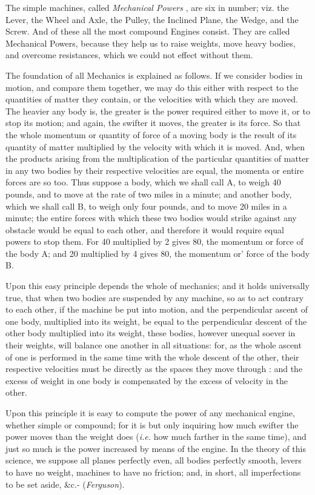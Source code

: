 The simple machines, called \textit{Mechanical Powers} , are six in number; viz. the Lever, the Wheel and Axle, the Pulley, the Inclined Plane, the Wedge, and the Screw. And of these all the most compound Engines consist. They are called Mechanical Powers, because they help us to raise weights, move heavy bodies, and overcome resistances, which we could not effect without them. 

The foundation of all Mechanics is explained as follows. If we consider bodies in motion, and compare them together, we may do this either with respect to the quantities of matter they contain, or the velocities with which they are moved. The heavier any body is, the greater is the power required either to move it, or to stop its motion; and again, the swifter it moves, the greater is its force. So that the whole momentum or quantity of force of a moving body is the result of its quantity of matter multiplied by the velocity with which it is moved. And, when the products arising from the multiplication of the particular quantities of matter in any two bodies by their respective velocities are equal, the momenta or entire forces are so too. Thus suppose a body, which we shall call A, to weigh 40 pounds, and to move at the rate of two miles in a minute; and another body, which we shall call B, to weigh only four pounds, and to move 20 miles in a minute; the entire forces with which these two bodies would strike against any obstacle would be equal to each other, and therefore it would require equal powers to stop them. For 40 multiplied by 2 gives 80, the momentum or force of the body A; and 20 multiplied by 4 gives 80, the momentum or' force of the body B. 

Upon this easy principle depends the whole of mechanics; and it holds universally true, that when two bodies are suspended by any machine, so as to act contrary to each other, if the machine be put into motion, and the perpendicular ascent of one body, multiplied into its weight, be equal to the perpendicular descent of the other body multiplied into its weight, these bodies, however unequal soever in their weights, will balance one another in all situations: for, as the whole ascent of one is performed in the same time with the whole descent of the other, their respective velocities must be directly as the spaces they move through : and the excess of weight in one body is compensated by the excess of velocity in the other. 

Upon this principle it is easy to compute the power of any mechanical engine, whether simple or compound; for it is but only inquiring how much swifter the power moves than the weight does (\textit{i.e.} how much farther in the same time), and just so much is the power increased by means of the engine. In the theory of this science, we suppose all planes perfectly even, all bodies perfectly smooth, levers to have no weight, machines to have no friction; and, in short, all imperfections to be set aside, \&c.- (\textit{Ferguson}). 

